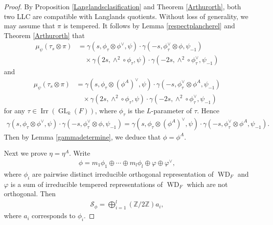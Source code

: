 \documentclass[article]{article}
\numberwithin{equation}{section}
\theoremstyle{definition}
\DeclareMathOperator{\WD}{WD}
\DeclareMathOperator{\GL}{GL}
\DeclareMathOperator{\Irr}{Irr}
\begin{document}
\begin{proof}
By Proposition \ref{Langlandsclasification} and Theorem \ref{Arthurorth}, both two LLC are compatible with Langlands quotients. Without loss of generality, we may assume that $\pi$ is tempered. It follows by Lemma \ref{respectplancherel} and Theorem \ref{Arthurorth} that 
\begin{align*}
\mu_{\psi}(\tau_s\otimes \pi)&=\gamma(s,\phi_{\tau}\otimes \phi^{ \vee},\psi)\cdot \gamma(-s,\phi_{\tau}^{\vee}\otimes\phi, \psi_{-1} )\\
&\quad  \times \gamma (2s, \wedge^2\circ \phi_{\tau}, \psi)\cdot \gamma(-2s, \wedge^{2} \circ \phi_{\tau}^{\vee},\psi_{-1})
\end{align*}
and 
\begin{align*}
\mu_{\psi}(\tau_s\otimes \pi)&=\gamma(s,\phi_{\tau}\otimes (\phi^{ A})^\vee,\psi)\cdot \gamma(-s,\phi_{\tau}^{\vee}\otimes\phi^A, \psi_{-1} )\\
&\quad  \times \gamma (2s, \wedge^2\circ \phi_{\tau}, \psi)\cdot \gamma(-2s, \wedge^{2} \circ \phi_{\tau}^{\vee},\psi_{-1})
\end{align*}
for any $\tau\in \Irr (\GL_k(F))$, where $\phi_{\tau}$ is the $L$-parameter of $\tau$. Hence
\begin{align*}
\gamma(s,\phi_{\tau}\otimes \phi^{ \vee},\psi)\cdot \gamma(-s,\phi_{\tau}^{\vee}\otimes\phi, \psi_{-1} )=\gamma(s,\phi_{\tau}\otimes (\phi^{ A})^\vee,\psi)\cdot \gamma(-s,\phi_{\tau}^{\vee}\otimes\phi^A, \psi_{-1} ).
\end{align*}
Then by Lemma \ref{gammadetermine}, we deduce that $\phi=\phi^A$. 

Next we prove $\eta=\eta^A$. Write 
	\begin{align*}
	\phi=m_1\phi_1\oplus \cdots \oplus m_l \phi_l\oplus \varphi\oplus \varphi^\vee,
	\end{align*}
	where $\phi_i$ are pairwise distinct irreducible orthogonal representation of $\WD_{F}$ and $\varphi$ is a sum of irreducible tempered representations of $\WD_F$ which are not orthogonal. Then 
	\begin{align*}
	\mathcal {S}_{\phi}=\bigoplus_{i=1}^l (\mathbb Z/2\mathbb Z)a_i,
	\end{align*} 
	where $a_i$ corresponds to $\phi_i$. 
	

\end{proof}
\end{document}
